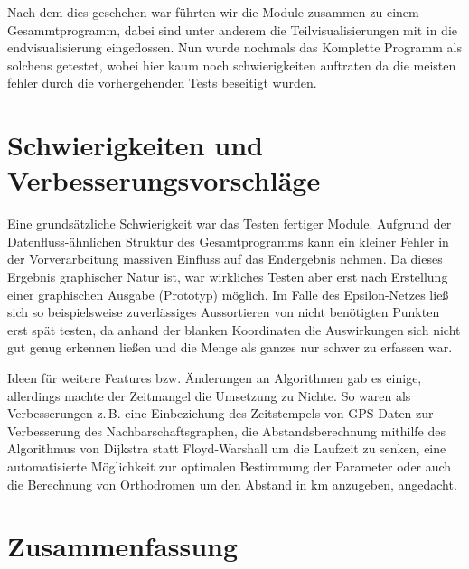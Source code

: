 \documentclass[parskip=half,
 fontsize=12pt, bibtotoc,
 ngerman]
 {article}
\begin{document}
Nach dem dies geschehen war führten wir die Module zusammen zu einem Gesammtprogramm, dabei sind unter anderem die Teilvisualisierungen mit in die endvisualisierung eingeflossen. Nun wurde nochmals das Komplette Programm als solchens getestet, wobei hier kaum noch schwierigkeiten auftraten da die meisten fehler durch die vorhergehenden Tests beseitigt wurden.

\section{Schwierigkeiten und Verbesserungsvorschläge}

Eine grundsätzliche Schwierigkeit war das Testen fertiger Module.
Aufgrund der Datenfluss-ähnlichen Struktur des Gesamtprogramms kann
ein kleiner Fehler in der Vorverarbeitung massiven Einfluss
auf das Endergebnis nehmen. Da dieses Ergebnis graphischer Natur ist,
war wirkliches Testen aber erst nach Erstellung einer graphischen Ausgabe
(Prototyp) möglich. Im Falle des Epsilon-Netzes ließ sich so beispielsweise 
zuverlässiges Aussortieren von nicht benötigten Punkten erst spät testen,
da anhand der blanken Koordinaten die Auswirkungen sich nicht gut genug
erkennen ließen und die Menge als ganzes nur schwer zu erfassen war.

Ideen für weitere Features bzw. Änderungen an Algorithmen gab es einige, 
allerdings machte der Zeitmangel die Umsetzung zu Nichte. So waren
als Verbesserungen z.\,B. eine Einbeziehung des Zeitstempels von GPS Daten
zur Verbesserung des Nachbarschaftsgraphen, die Abstandsberechnung mithilfe des
Algorithmus von Dijkstra statt Floyd-Warshall um die Laufzeit zu senken,
eine automatisierte Möglichkeit zur optimalen Bestimmung der Parameter oder
auch die Berechnung von Orthodromen um den Abstand in km anzugeben, angedacht.

\section{Zusammenfassung}
\printbibliography
\end{document}
